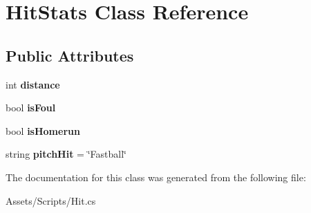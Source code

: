 \hypertarget{class_hit_stats}{}\section{Hit\+Stats Class Reference}
\label{class_hit_stats}
\subsection*{Public Attributes}
\begin{DoxyCompactItemize}
\item 
int {\bfseries distance}\hypertarget{class_hit_stats_a50196bb16cd42ca91c565e1e3d7988e1}{}\label{class_hit_stats_a50196bb16cd42ca91c565e1e3d7988e1}

\item 
bool {\bfseries is\+Foul}\hypertarget{class_hit_stats_a42561db85f6bd6958ecf2c841e73fe0d}{}\label{class_hit_stats_a42561db85f6bd6958ecf2c841e73fe0d}

\item 
bool {\bfseries is\+Homerun}\hypertarget{class_hit_stats_af25010a95cafda1b449d7aa5ff0d3c3f}{}\label{class_hit_stats_af25010a95cafda1b449d7aa5ff0d3c3f}

\item 
string {\bfseries pitch\+Hit} = \char`\"{}Fastball\char`\"{}\hypertarget{class_hit_stats_a6c3f24e46c8637b631b581d9378120e7}{}\label{class_hit_stats_a6c3f24e46c8637b631b581d9378120e7}

\end{DoxyCompactItemize}


The documentation for this class was generated from the following file\+:\begin{DoxyCompactItemize}
\item 
Assets/\+Scripts/Hit.\+cs\end{DoxyCompactItemize}

